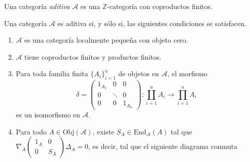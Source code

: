\documentclass[tesis]{subfiles}
\begin{document}
\begin{Def}\label{Def: Categoría aditiva}
    Una categoría \emph{aditiva} $\mathscr{A}$ es una $\mathbb{Z}$-categoría con coproductos finitos.
\end{Def}

\begin{Teo} \label{Mendoza-1.9.14}
    Una categoría $\mathscr{A}$ es aditiva si, y sólo si, las siguientes condiciones se satisfacen.

    \begin{enumerate}[label=(\alph*)]
        \item $\mathscr{A}$ es una categoría localmente pequeña con objeto cero.

        \item $\mathscr{A}$ tiene coproductos finitos y productos finitos.

        \item Para toda familia finita $\{A_i\}_{i=1}^n$ de objetos en $\mathscr{A}$, el morfismo
            \[
            \delta=\begin{pmatrix} 1_{A_1} &0 &0 \\ 0 &\ddots &0 \\ 0 & 0 &1_{A_n}\end{pmatrix}:\coprod_{i=1}^n A_i\to \prod_{i=1}^n A_i
            \] 
            es un isomorfismo en $\mathscr{A}$.

        \item Para todo $A\in\text{Obj}(\mathscr{A})$, existe $S_A\in\text{End}_\mathscr{A}(A)$ tal que $\nabla_A\begin{pmatrix} 1_A &0 \\ 0 &S_A \end{pmatrix}\Delta_A = 0$, es decir, tal que el siguiente diagrama conmuta
            \begin{center}
            \end{center}
    \end{enumerate}
\end{Teo}
\end{document}
